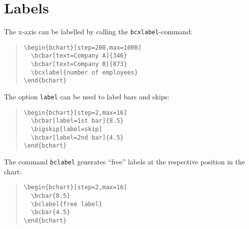 \documentclass{article}
\begin{document}
\section{Labels}

The x-axis can be labelled by calling the \texttt{bcxlabel}-command:
\begin{quote}\small
\begin{verbatim}
\begin{bchart}[step=200,max=1000]
  \bcbar[text=Company A]{346}
  \bcbar[text=Company B]{873}
  \bcxlabel{number of employees}
\end{bchart}
\end{verbatim}
\end{quote}
\begin{quote}
\begin{bchart}[step=200,max=1000]
\end{bchart}
\end{quote}
The option \texttt{label} can be used to label bars and skips:
\begin{quote}\small
\begin{verbatim}
\begin{bchart}[step=2,max=16]
  \bcbar[label=1st bar]{8.5}
  \bigskip[label=skip]
  \bcbar[label=2nd bar]{4.5}
\end{bchart}
\end{verbatim}
\end{quote}
\begin{quote}
\begin{bchart}[step=2,max=16]
  \bigskip[label=skip]
\end{bchart}
\end{quote}
The command \texttt{bclabel} generates ``free'' labels at the respective position in the chart:
\begin{quote}\small
\begin{verbatim}
\begin{bchart}[step=2,max=16]
  \bcbar{8.5}
  \bclabel{free label}
  \bcbar{4.5}
\end{bchart}
\end{verbatim}
\end{quote}
\begin{quote}
\begin{bchart}[step=2,max=16]
\end{bchart}
\end{quote}
\end{document}

